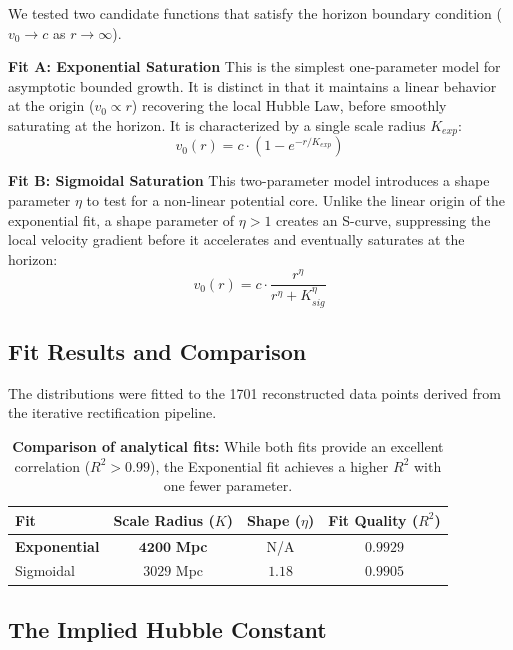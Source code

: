 \documentclass[11pt]{article}
\begin{document}
We tested two candidate functions that satisfy the horizon boundary condition ($v_0 \to c$ as $r \to \infty$).

\textbf{Fit A: Exponential Saturation}
This is the simplest one-parameter model for asymptotic bounded growth. It is distinct in that it maintains a linear behavior at the origin ($v_0 \propto r$) recovering the local Hubble Law, before smoothly saturating at the horizon. It is characterized by a single scale radius $K_{exp}$:
\begin{equation}
    v_0(r) = c \cdot \left( 1 - e^{-r/K_{exp}} \right)
\end{equation}

\textbf{Fit B: Sigmoidal Saturation}
This two-parameter model introduces a shape parameter $\eta$ to test for a non-linear potential core. Unlike the linear origin of the exponential fit, a shape parameter of $\eta > 1$ creates an S-curve, suppressing the local velocity gradient before it accelerates and eventually saturates at the horizon:
\begin{equation}
    v_0(r) = c \cdot \frac{r^\eta}{r^\eta + K_{sig}^\eta}
\end{equation}

\subsection{Fit Results and Comparison}

The distributions were fitted to the 1701 reconstructed data points derived from the iterative rectification pipeline.

\begin{table}[h]
    \centering
    \begin{tabular}{|l|c|c|c|}
        \hline
        \textbf{Fit} & \textbf{Scale Radius ($K$)} & \textbf{Shape ($\eta$)} & \textbf{Fit Quality ($R^2$)} \\
        \hline
        \textbf{Exponential} & $\mathbf{4200}$ \textbf{Mpc} & N/A & $\mathbf{0.9929}$ \\
        Sigmoidal & $3029$ Mpc & $1.18$ & $0.9905$ \\
        \hline
    \end{tabular}
    \caption{\textbf{Comparison of analytical fits:} While both fits provide an excellent correlation ($R^2 > 0.99$), the Exponential fit achieves a higher $R^2$ with one fewer parameter.}
    \label{tab:potential_fit}
\end{table}

\subsection{The Implied Hubble Constant}
\end{document}
